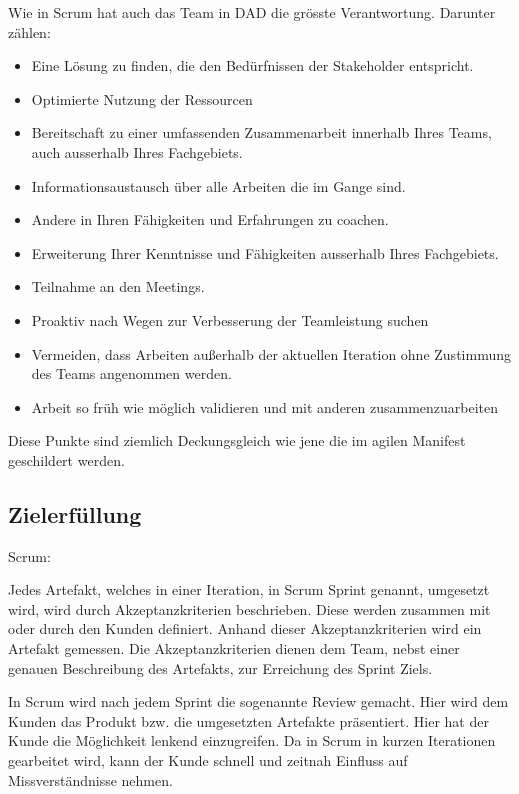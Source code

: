 Wie in Scrum hat auch das Team in DAD die grösste Verantwortung. Darunter zählen:

\begin{itemize}
	\item Eine Lösung zu finden, die den Bedürfnissen der Stakeholder entspricht.
	\item Optimierte Nutzung der Ressourcen
	\item Bereitschaft zu einer umfassenden Zusammenarbeit innerhalb Ihres Teams, auch ausserhalb Ihres Fachgebiets.
	\item Informationsaustausch über alle Arbeiten die im Gange sind.
	\item Andere in Ihren Fähigkeiten und Erfahrungen zu coachen.
	\item Erweiterung Ihrer Kenntnisse und Fähigkeiten ausserhalb Ihres Fachgebiets.
	\item Teilnahme an den Meetings.
	\item Proaktiv nach Wegen zur Verbesserung der Teamleistung suchen
	\item Vermeiden, dass Arbeiten außerhalb der aktuellen Iteration ohne Zustimmung des Teams angenommen werden.
	\item Arbeit so früh wie möglich validieren und mit anderen zusammenzuarbeiten
\end{itemize}

Diese Punkte sind ziemlich Deckungsgleich wie jene die im agilen Manifest geschildert werden. 

\subsection{Zielerfüllung}

\medskip
{\Large Scrum:} \medskip

Jedes Artefakt, welches in einer Iteration, in Scrum Sprint genannt, umgesetzt wird, wird durch Akzeptanzkriterien beschrieben. Diese werden zusammen mit oder durch den Kunden definiert. Anhand dieser Akzeptanzkriterien wird ein Artefakt gemessen. Die Akzeptanzkriterien dienen dem Team, nebst einer genauen Beschreibung des Artefakts, zur Erreichung des Sprint Ziels.

In Scrum wird nach jedem Sprint die sogenannte Review gemacht. Hier wird dem Kunden das Produkt bzw. die umgesetzten Artefakte präsentiert. Hier hat der Kunde die Möglichkeit lenkend einzugreifen. Da in Scrum in kurzen Iterationen gearbeitet wird, kann der Kunde schnell und zeitnah Einfluss auf Missverständnisse nehmen.

